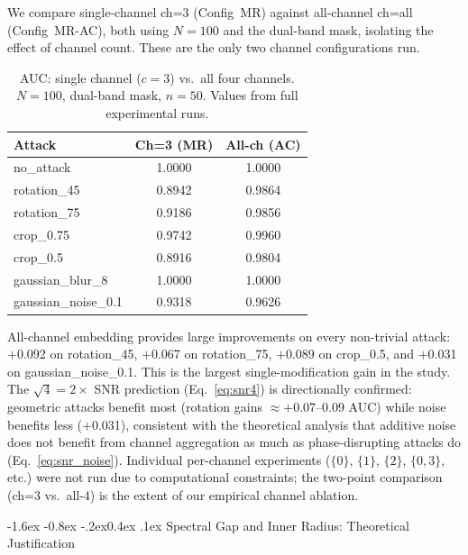 \documentclass[10pt,twocolumn]{article}
\makeatletter
\renewcommand\subsection{\@startsection{subsection}{2}{\z@}%
  {-1.6ex \@plus -0.8ex \@minus -.2ex}{0.4ex \@plus .1ex}%
  {\normalfont\normalsize\itshape}}
\makeatother
\begin{document}
We compare single-channel ch=3 (Config~MR) against all-channel
ch=all (Config~MR-AC), both using $N{=}100$ and the dual-band mask,
isolating the effect of channel count.
These are the only two channel configurations run.

\begin{table}[htbp]
  \centering
  \caption{AUC: single channel ($c{=}3$) vs.\ all four channels.
    $N{=}100$, dual-band mask, $n{=}50$. Values from full experimental runs.}
  \label{tab:channel_ablation}
  \setlength{\tabcolsep}{3pt}
  \small
  \begin{tabular}{lcc}
    \toprule
    \textbf{Attack} & \textbf{Ch=3} (MR) & \textbf{All-ch} (AC) \\
    \midrule
    no\_attack           & 1.0000 & 1.0000 \\
    rotation\_45         & 0.8942 & 0.9864 \\
    rotation\_75         & 0.9186 & 0.9856 \\
    crop\_0.75           & 0.9742 & 0.9960 \\
    crop\_0.5            & 0.8916 & 0.9804 \\
    gaussian\_blur\_8    & 1.0000 & 1.0000 \\
    gaussian\_noise\_0.1 & 0.9318 & 0.9626 \\
    \bottomrule
  \end{tabular}
\end{table}

All-channel embedding provides large improvements on every non-trivial
attack: $+$0.092 on rotation\_45, $+$0.067 on rotation\_75,
$+$0.089 on crop\_0.5, and $+$0.031 on gaussian\_noise\_0.1.
This is the largest single-modification gain in the study.
The $\sqrt{4} = 2\times$ SNR prediction (Eq.~\ref{eq:snr4}) is
directionally confirmed: geometric attacks benefit most (rotation
gains $\approx$$+$0.07--0.09 AUC) while noise benefits less
($+$0.031), consistent with the theoretical analysis that additive
noise does not benefit from channel aggregation as much as
phase-disrupting attacks do (Eq.~\ref{eq:snr_noise}).
Individual per-channel experiments ($\{0\}$, $\{1\}$, $\{2\}$,
$\{0,3\}$, etc.) were not run due to computational constraints;
the two-point comparison (ch=3 vs.\ all-4) is the extent of our
empirical channel ablation.

\subsection{Spectral Gap and Inner Radius: Theoretical Justification}
\end{document}
